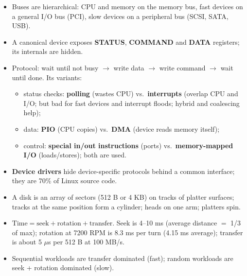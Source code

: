 \documentclass[11pt,a4paper]{article}
\begin{document}
\begin{keybox}
\begin{itemize}
  \item Buses are hierarchical: CPU and memory on the memory bus, fast
        devices on a general I/O bus (PCI), slow devices on a peripheral bus
        (SCSI, SATA, USB).
  \item A canonical device exposes \textbf{STATUS}, \textbf{COMMAND} and
        \textbf{DATA} registers; its internals are hidden.
  \item Protocol: wait until not busy \(\to\) write data \(\to\) write
        command \(\to\) wait until done. Its variants:
    \begin{itemize}
      \item status checks: \textbf{polling} (wastes CPU) vs.\
            \textbf{interrupts} (overlap CPU and I/O; but bad for fast devices
            and interrupt floods; hybrid and coalescing help);
      \item data: \textbf{PIO} (CPU copies) vs.\ \textbf{DMA} (device reads
            memory itself);
      \item control: \textbf{special in/out instructions} (ports) vs.\
            \textbf{memory-mapped I/O} (loads/stores); both are used.
    \end{itemize}
  \item \textbf{Device drivers} hide device-specific protocols behind a
        common interface; they are 70\% of Linux source code.
  \item A disk is an array of sectors (512 B or 4 KB) on tracks of platter
        surfaces; tracks at the same position form a cylinder; heads on one
        arm; platters spin.
  \item \(\text{Time} = \text{seek} + \text{rotation} + \text{transfer}\).
        Seek is 4--10 ms (average distance \(=\) 1/3 of max); rotation at 7200
        RPM is 8.3 ms per turn (4.15 ms average); transfer is about 5
        \(\mu\)s per 512 B at 100 MB/s.
  \item Sequential workloads are transfer dominated (fast); random workloads
        are seek + rotation dominated (slow).
\end{itemize}
\end{keybox}
\end{document}
